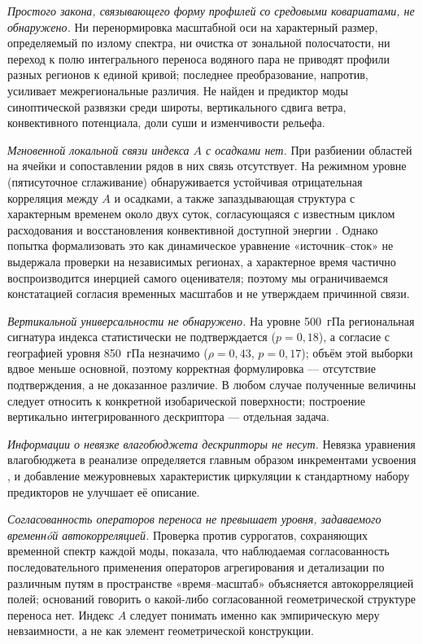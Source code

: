 \documentclass[11pt,a4paper]{article}
\begin{document}
\emph{Простого закона, связывающего форму профилей со средовыми ковариатами, не обнаружено.} Ни перенормировка масштабной оси на характерный размер, определяемый по излому спектра, ни очистка от зональной полосчатости, ни переход к полю интегрального переноса водяного пара не приводят профили разных регионов к единой кривой; последнее преобразование, напротив, усиливает межрегиональные различия. Не найден и предиктор моды синоптической развязки среди широты, вертикального сдвига ветра, конвективного потенциала, доли суши и изменчивости рельефа.

\emph{Мгновенной локальной связи индекса $A$ с осадками нет.} При разбиении областей на ячейки и сопоставлении рядов в них связь отсутствует. На режимном уровне (пятисуточное сглаживание) обнаруживается устойчивая отрицательная корреляция между $A$ и осадками, а также запаздывающая структура с характерным временем около двух суток, согласующаяся с известным циклом расходования и восстановления конвективной доступной энергии \cite{Masunaga2012,PetersNeelin2006}. Однако попытка формализовать это как динамическое уравнение «источник--сток» не выдержала проверки на независимых регионах, а характерное время частично воспроизводится инерцией самого оценивателя; поэтому мы ограничиваемся констатацией согласия временных масштабов и не утверждаем причинной связи.

\emph{Вертикальной универсальности не обнаружено.} На уровне 500~гПа региональная сигнатура индекса статистически не подтверждается ($p=0{,}18$), а согласие с географией уровня 850~гПа незначимо ($\rho=0{,}43$, $p=0{,}17$); объём этой выборки вдвое меньше основной, поэтому корректная формулировка --- отсутствие подтверждения, а не доказанное различие. В любом случае полученные величины следует относить к конкретной изобарической поверхности; построение вертикально интегрированного дескриптора --- отдельная задача.

\emph{Информации о невязке влагобюджета дескрипторы не несут.} Невязка уравнения влагобюджета в реанализе определяется главным образом инкрементами усвоения \cite{Trenberth1991,Mayer2021}, и добавление межуровневых характеристик циркуляции к стандартному набору предикторов не улучшает её описание.

\emph{Согласованность операторов переноса не превышает уровня, задаваемого временнóй автокорреляцией.} Проверка против суррогатов, сохраняющих временной спектр каждой моды, показала, что наблюдаемая согласованность последовательного применения операторов агрегирования и детализации по различным путям в пространстве «время--масштаб» объясняется автокорреляцией полей; оснований говорить о какой-либо согласованной геометрической структуре переноса нет. Индекс $A$ следует понимать именно как эмпирическую меру невзаимности, а не как элемент геометрической конструкции.
\end{document}
